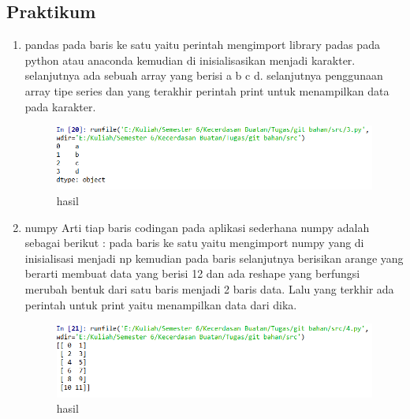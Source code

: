\subsection{Praktikum}
\begin{enumerate}
\item pandas 
pada baris ke satu yaitu perintah mengimport library padas pada python atau anaconda kemudian di inisialisasikan menjadi karakter. selanjutnya ada sebuah array yang berisi a b c d. selanjutnya penggunaan array tipe series dan yang terakhir perintah print untuk menampilkan data pada karakter.

\begin{figure}[ht]
\centering
\includegraphics[scale=0.5]{figures/1174003/3/3.PNG}
\caption{hasil}
\label{contoh}
\end{figure}

\item numpy
Arti tiap baris codingan pada aplikasi sederhana numpy adalah sebagai berikut : pada baris ke satu yaitu mengimport numpy yang di inisialisasi menjadi np kemudian pada baris selanjutnya berisikan arange yang berarti membuat data yang berisi 12 dan ada reshape yang berfungsi merubah bentuk dari satu baris menjadi 2 baris data. Lalu yang terkhir ada perintah untuk print yaitu menampilkan data dari dika.

\begin{figure}[ht]
\centering
\includegraphics[scale=0.5]{figures/1174003/3/4.PNG}
\caption{hasil}
\label{contoh}
\end{figure}


\end{enumerate}
